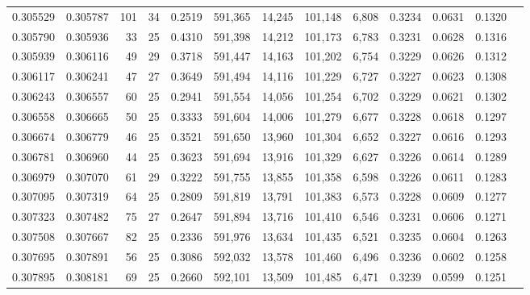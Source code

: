 \begin{tabular}{rrrrrrrrrrrrr}
0.305529 & 0.305787 & 101 &  34 &                                     0.2519 & 591,365 &  14,245 & 101,148 &   6,808 & 0.3234 & 0.0631 & 0.1320 \\
0.305790 & 0.305936 &  33 &  25 &                                     0.4310 & 591,398 &  14,212 & 101,173 &   6,783 & 0.3231 & 0.0628 & 0.1316 \\
0.305939 & 0.306116 &  49 &  29 &                                     0.3718 & 591,447 &  14,163 & 101,202 &   6,754 & 0.3229 & 0.0626 & 0.1312 \\
0.306117 & 0.306241 &  47 &  27 &                                     0.3649 & 591,494 &  14,116 & 101,229 &   6,727 & 0.3227 & 0.0623 & 0.1308 \\
0.306243 & 0.306557 &  60 &  25 &                                     0.2941 & 591,554 &  14,056 & 101,254 &   6,702 & 0.3229 & 0.0621 & 0.1302 \\
0.306558 & 0.306665 &  50 &  25 &                                     0.3333 & 591,604 &  14,006 & 101,279 &   6,677 & 0.3228 & 0.0618 & 0.1297 \\
0.306674 & 0.306779 &  46 &  25 &                                     0.3521 & 591,650 &  13,960 & 101,304 &   6,652 & 0.3227 & 0.0616 & 0.1293 \\
0.306781 & 0.306960 &  44 &  25 &                                     0.3623 & 591,694 &  13,916 & 101,329 &   6,627 & 0.3226 & 0.0614 & 0.1289 \\
0.306979 & 0.307070 &  61 &  29 &                                     0.3222 & 591,755 &  13,855 & 101,358 &   6,598 & 0.3226 & 0.0611 & 0.1283 \\
0.307095 & 0.307319 &  64 &  25 &                                     0.2809 & 591,819 &  13,791 & 101,383 &   6,573 & 0.3228 & 0.0609 & 0.1277 \\
0.307323 & 0.307482 &  75 &  27 &                                     0.2647 & 591,894 &  13,716 & 101,410 &   6,546 & 0.3231 & 0.0606 & 0.1271 \\
0.307508 & 0.307667 &  82 &  25 &                                     0.2336 & 591,976 &  13,634 & 101,435 &   6,521 & 0.3235 & 0.0604 & 0.1263 \\
0.307695 & 0.307891 &  56 &  25 &                                     0.3086 & 592,032 &  13,578 & 101,460 &   6,496 & 0.3236 & 0.0602 & 0.1258 \\
0.307895 & 0.308181 &  69 &  25 &                                     0.2660 & 592,101 &  13,509 & 101,485 &   6,471 & 0.3239 & 0.0599 & 0.1251 \\

\end{tabular}
